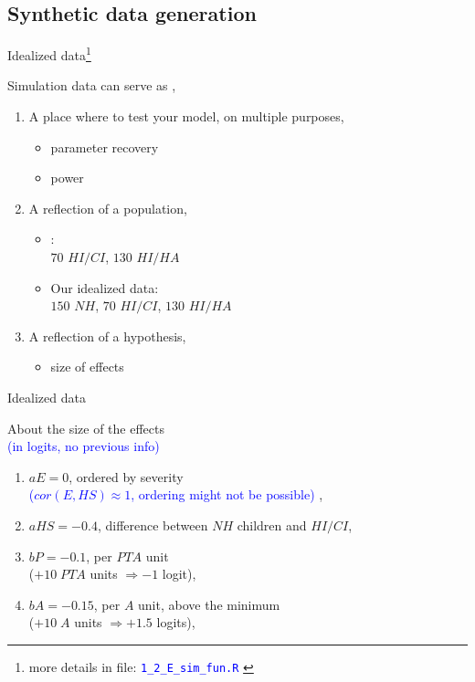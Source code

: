 \subsection{Synthetic data generation}
%
%
\begin{frame}[t, negative]
	\subsectionpage
\end{frame}
%
%
\begin{lhframe}[rhgraphic={\texttt{[image: sim\_code1.png]}}]
	{Idealized data\footnote{more details in file: \textcolor{blue}{\texttt{1\_2\_E\_sim\_fun.R} }}}
	
	Simulation data can serve as \cite{Kruschke_2014, McElreath_2020},
	\begin{enumerate}
		\item A place where to test your model, on multiple purposes,
		\begin{itemize}
			\item parameter recovery
			\item power
		\end{itemize}
		\item A reflection of a population, 
		\begin{itemize}
			\item \citet{DeRaeve_2016}: \\
			$70$ $HI/CI$, $130$ $HI/HA$
			\item Our idealized data: \\
			$150$ $NH$, $70$ $HI/CI$, $130$ $HI/HA$
		\end{itemize}
		\item A reflection of a hypothesis,
		\begin{itemize}
			\item size of effects
		\end{itemize}
	\end{enumerate}
\end{lhframe}
%
%
\begin{lhframe}[rhgraphic={\texttt{[image: sim\_code1.png]}}]
	{Idealized data}
	
	About the size of the effects \\
	{\small \textcolor{blue}{(in logits, no previous info)} }
	\begin{enumerate}
		\item $aE=0$, ordered by severity \\
		{\small \textcolor{blue}{($cor(E, HS) \approx 1$, ordering might not be possible)} },
		\item $aHS=-0.4$, difference between $NH$ children and $HI/CI$,
		\item $bP=-0.1$, per $PTA$ unit \\
		($+10 \; PTA$ units $\Rightarrow -1$ logit),
		\item $bA=-0.15$, per $A$ unit, above the minimum \\
		($+10 \; A$ units $\Rightarrow +1.5$ logits),
	\end{enumerate}
\end{lhframe}
